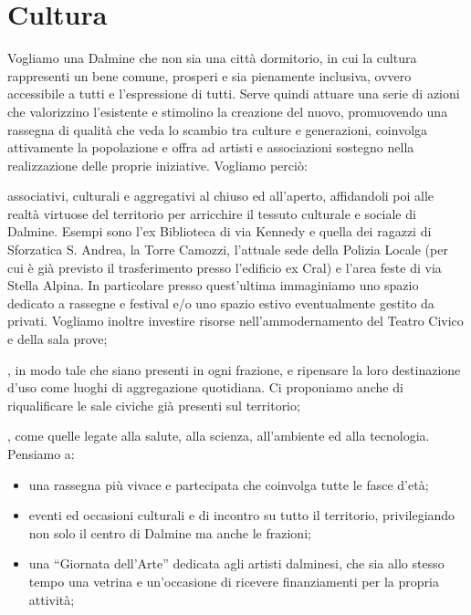 \section{Cultura}
Vogliamo una Dalmine che non sia una città dormitorio, in cui la cultura rappresenti un bene comune, prosperi e sia pienamente inclusiva, ovvero accessibile a tutti e l'espressione di tutti. Serve quindi attuare una serie di azioni che valorizzino l'esistente e stimolino la creazione del nuovo, promuovendo una rassegna di qualità che veda lo scambio tra culture e generazioni, coinvolga attivamente la popolazione e offra ad artisti e associazioni sostegno nella realizzazione delle proprie iniziative. Vogliamo perciò:

 associativi, culturali e aggregativi al chiuso ed all'aperto, affidandoli poi alle realtà virtuose del territorio per arricchire il tessuto culturale e sociale di Dalmine. Esempi sono l'ex Biblioteca di via Kennedy e quella dei ragazzi di Sforzatica S. Andrea, la Torre Camozzi, l'attuale sede della Polizia Locale (per cui è già previsto il trasferimento presso l'edificio ex Cral) e l'area feste di via Stella Alpina. In particolare presso quest'ultima immaginiamo uno spazio dedicato a rassegne e festival e/o uno spazio estivo eventualmente gestito da privati. Vogliamo inoltre investire risorse nell'ammodernamento del Teatro Civico e della sala prove;

, in modo tale che siano presenti in ogni frazione, e  ripensare la loro destinazione d'uso come luoghi di aggregazione quotidiana. Ci proponiamo anche di riqualificare le sale civiche già presenti sul territorio; 

\begin{bluebox}
, come quelle legate alla salute, alla scienza, all'ambiente ed alla tecnologia. Pensiamo a:
\begin{itemize}
  \item una rassegna più vivace e partecipata che coinvolga tutte le fasce d'età;
  \item eventi ed occasioni culturali e di incontro su tutto il territorio, privilegiando non solo il centro di Dalmine ma anche le frazioni;
  \item una ``Giornata dell'Arte'' dedicata agli artisti dalminesi, che sia allo stesso tempo una vetrina e un'occasione di ricevere finanziamenti per la propria attività; 
\end{itemize}
\end{bluebox}

